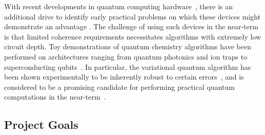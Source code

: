 \documentclass[11pt]{article}
\begin{document}
With recent developments in quantum computing
hardware~\cite{Corcoles2015,Riste2015,Kelly2015,Barends2016,Roushan2017},
there is an additional drive to identify early practical problems on
which these devices might demonstrate an advantage
\cite{Boixo2016}. The challenge of using such devices in
the near-term is that limited coherence requirements necessitates
algorithms with extremely low circuit depth. Toy demonstrations of
quantum chemistry algorithms have been performed on architectures
ranging from quantum photonics and ion traps to superconducting
qubits~\cite{Lanyon2010,Li2011,Wang2014,Peruzzo2013,Shen2015,OMalley2016,Kandala2017}. In
particular, the variational quantum algorithm
\cite{Peruzzo2013,McClean:2016qr} has been shown experimentally to be
inherently robust to certain errors~\cite{OMalley2016}, and is
considered to be a promising candidate for performing practical
quantum computations in the near-term~\cite{Wecker:2015bk,Mueck2015}.

\subsection{Project Goals}
\end{document}
